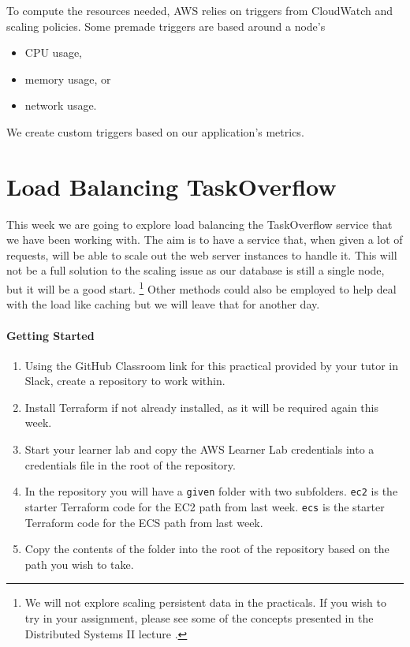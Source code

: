 \documentclass{csse4400}
\begin{document}
To compute the resources needed, AWS relies on triggers from CloudWatch and scaling policies.
Some premade triggers are based around a node's

\begin{itemize}
    \item CPU usage,
    \item memory usage, or 
    \item network usage.
\end{itemize}

We create custom triggers based on our application's metrics.

\section{Load Balancing TaskOverflow}

This week we are going to explore load balancing the TaskOverflow service that we have been working with.
The aim is to have a service that, when given a lot of requests,
will be able to scale out the web server instances to handle it.
This will not be a full solution to the scaling issue as our database is still a single node,
but it will be a good start.%
\footnote{We will not explore scaling persistent data in the practicals.
If you wish to try in your assignment,
please see some of the concepts presented in the Distributed Systems II lecture \cite{distributed2-slides}.}
Other methods could also be employed to help deal with the load like caching but we will leave that for another day.

\paragraph{Getting Started}
\begin{enumerate}
    \item Using the GitHub Classroom link for this practical provided by your tutor in Slack,
create a repository to work within.
    \item Install Terraform if not already installed, as it will be required again this week.
    \item Start your learner lab and copy the AWS Learner Lab credentials into a credentials file in the root of the repository.
    \item In the repository you will have a \texttt{given} folder with two subfolders.
        \texttt{ec2} is the starter Terraform code for the EC2 path from last week.
        \texttt{ecs} is the starter Terraform code for the ECS path from last week.
    \item Copy the contents of the folder into the root of the repository based on the path you wish to take.
\end{enumerate}
\end{document}
